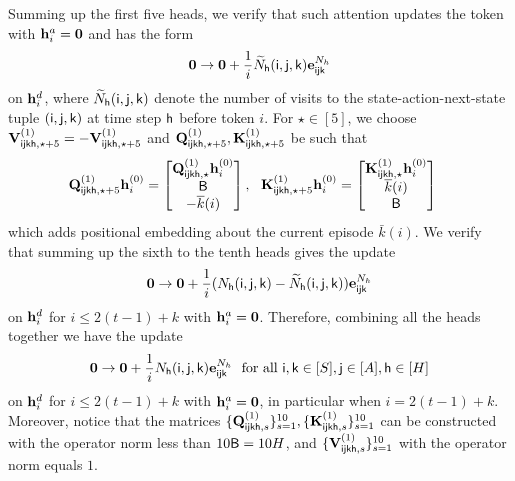 Summing up the first five heads, we verify that such attention updates the token with ${\mathbf h}_i^{a}={\mathbf 0}$ and has the form
\begin{align*}
{\mathbf 0}\rightarrow{\mathbf 0}+\frac1i\widetilde{{N}}_{\mathsf{h}}({\mathsf{i}},{\mathsf{j}},{\mathsf{k}}){\mathbf e}_{{\mathsf{i}}{\mathsf{j}}{\mathsf{k}}}^{{N}_h}
\end{align*} on  ${\mathbf h}^{d}_i$, where $\widetilde{{N}}_{\mathsf{h}}({\mathsf{i}},{\mathsf{j}},{\mathsf{k}})$ denote the number of visits to the state-action-next-state tuple $({\mathsf{i}},{\mathsf{j}},{\mathsf{k}})$ at time step ${\mathsf{h}}$ before token $i$. For $\star\in[5]$, we choose ${\mathbf V}^{(1)}_{{\mathsf{i}}{\mathsf{j}}{\mathsf{k}}{\mathsf{h}},\star+5}=-{\mathbf V}^{(1)}_{{\mathsf{i}}{\mathsf{j}}{\mathsf{k}}{\mathsf{h}},\star+5}$ and ${\mathbf Q}^{(1)}_{{\mathsf{i}}{\mathsf{j}}{\mathsf{k}}{\mathsf{h}},\star+5},{\mathbf K}^{(1)}_{{\mathsf{i}}{\mathsf{j}}{\mathsf{k}}{\mathsf{h}},\star+5}$ be such that 
\begin{align*}
&{\mathbf Q}^{(1)}_{{\mathsf{i}}{\mathsf{j}}{\mathsf{k}}{\mathsf{h}},\star+5}{\mathbf h}^{(0)}_{i}=
\begin{bmatrix}
{\mathbf Q}^{(1)}_{{\mathsf{i}}{\mathsf{j}}{\mathsf{k}}{\mathsf{h}},\star}{\mathbf h}^{(0)}_{i}\\
{\mathsf{B}}\\
-\overline{k}(i)
    \end{bmatrix},~~ {\mathbf K}^{(1)}_{{\mathsf{i}}{\mathsf{j}}{\mathsf{k}}{\mathsf{h}},\star+5}{\mathbf h}^{(0)}_{i}=\begin{bmatrix}
{\mathbf K}^{(1)}_{{\mathsf{i}}{\mathsf{j}}{\mathsf{k}}{\mathsf{h}},\star}{\mathbf h}^{(0)}_{i}\\ \overline{k}(i)\\{\mathsf{B}}
\end{bmatrix}
\end{align*} which adds positional embedding about the current episode $\bar{k}(i)$. We verify that summing up the sixth to the tenth heads gives the update  \begin{align*}
{\mathbf 0}\rightarrow{\mathbf 0}+\frac{1}{i}({{N}}_{\mathsf{h}}({\mathsf{i}},{\mathsf{j}},{\mathsf{k}})-\widetilde{{N}}_{\mathsf{h}}({\mathsf{i}},{\mathsf{j}},{\mathsf{k}})){\mathbf e}_{{\mathsf{i}}{\mathsf{j}}{\mathsf{k}}}^{{N}_h}
\end{align*} on  ${\mathbf h}^{d}_i$ for $i\leq 2(t-1)+k$ with ${\mathbf h}_i^{a}={\mathbf 0}$. Therefore, combining all the heads together we have the update
\begin{align*}
{\mathbf 0}\rightarrow{\mathbf 0}+\frac{1}{i}{{N}}_{\mathsf{h}}({\mathsf{i}},{\mathsf{j}},{\mathsf{k}}){\mathbf e}_{{\mathsf{i}}{\mathsf{j}}{\mathsf{k}}}^{{N}_h}\text{~~for all~}{\mathsf{i}},{\mathsf{k}}\in[{S}],{\mathsf{j}}\in[{A}],{\mathsf{h}}\in[{H}]
\end{align*} on ${\mathbf h}^{d}_i$ for $i\leq 2(t-1)+k$ with ${\mathbf h}_i^{a}={\mathbf 0}$, in particular when $i=2(t-1)+k$. Moreover,  notice that the matrices $\{{\mathbf Q}^{(1)}_{{\mathsf{i}}{\mathsf{j}}{\mathsf{k}}{\mathsf{h}},s}\}_{s=1}^{10},\{{\mathbf K}^{(1)}_{{\mathsf{i}}{\mathsf{j}}{\mathsf{k}}{\mathsf{h}},s}\}_{s=1}^{10}$ can be constructed with the operator norm less than $10{\mathsf{B}}=10{H}$, and $\{{\mathbf V}^{(1)}_{{\mathsf{i}}{\mathsf{j}}{\mathsf{k}}{\mathsf{h}},s}\}_{s=1}^{10}$ with the operator norm equals $1$.

